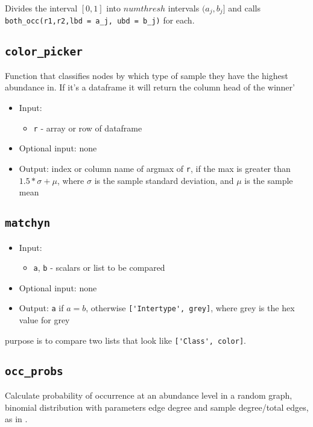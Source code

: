 \documentclass[10pt]{article}
\theoremstyle{definition}
\numberwithin{theorem}{section}
\numberwithin{definition}{section}
\numberwithin{lemma}{section}
\numberwithin{corollary}{section}
\numberwithin{clm}{section}
\numberwithin{rmk}{section}
\begin{document}
Divides the interval $[0,1]$ into $numthresh$ intervals $(a_j,b_j]$ and calls \verb|both_occ(r1,r2,lbd = a_j, ubd = b_j)| for each. 

\cprotect \subsection{\verb|color_picker|}
Function that classifies nodes by which type of sample they have the highest abundance in. If it's a dataframe it will return the column head of the winner'

\begin{itemize}
	\item Input: \begin{itemize}
		\item \verb|r| - array or row of dataframe 
	\end{itemize}
	\item Optional input: none
	\item Output: index or column name of argmax of \verb|r|, if the max is greater than $1.5*\sigma  + \mu$, where $\sigma$ is the sample standard deviation, and $\mu$ is the sample mean
\end{itemize}

\cprotect \subsection{\verb|matchyn|}

\begin{itemize}
	\item Input: \begin{itemize}
		\item \verb|a|, \verb|b| - scalars or list to be compared
	\end{itemize}
	\item Optional input: none
	\item Output: \verb|a| if $a = b$, otherwise \verb|['Intertype', grey]|, where grey is the hex value for grey
\end{itemize}

purpose is to compare two lists that look like \verb|['Class', color]|. 

\cprotect \subsection{\verb|occ_probs|}
Calculate probability of occurrence at an abundance level in a random graph, binomial distribution with parameters edge degree and sample degree/total edges, as in \cite{coocc}.
\end{document}
